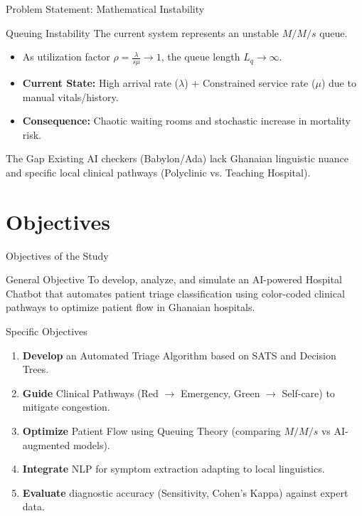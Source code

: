 \documentclass[aspectratio=169,12pt]{beamer}
\begin{document}
	\begin{frame}{Problem Statement: Mathematical Instability}
		\begin{alertblock}{Queuing Instability}
			The current system represents an unstable $M/M/s$ queue.
		\end{alertblock}
		
		\begin{itemize}
			\item As utilization factor $\rho = \frac{\lambda}{s\mu} \to 1$, the queue length $L_q \to \infty$.
			\item \textbf{Current State:} High arrival rate ($\lambda$) + Constrained service rate ($\mu$) due to manual vitals/history.
			\item \textbf{Consequence:} Chaotic waiting rooms and stochastic increase in mortality risk.
		\end{itemize}
		
		\begin{exampleblock}{The Gap}
			Existing AI checkers (Babylon/Ada) lack Ghanaian linguistic nuance and specific local clinical pathways (Polyclinic vs. Teaching Hospital).
		\end{exampleblock}
	\end{frame}
	
	\section{Objectives }
	
	\begin{frame}{Objectives of the Study}
		\begin{block}{General Objective}
			To develop, analyze, and simulate an AI-powered Hospital Chatbot that automates patient triage classification using color-coded clinical pathways to optimize patient flow in Ghanaian hospitals.
		\end{block}
		
		\begin{block}{Specific Objectives}
			\begin{enumerate}
				\item \textbf{Develop} an Automated Triage Algorithm based on SATS and Decision Trees.
				\item \textbf{Guide} Clinical Pathways (Red $\to$ Emergency, Green $\to$ Self-care) to mitigate congestion.
				\item \textbf{Optimize} Patient Flow using Queuing Theory (comparing $M/M/s$ vs AI-augmented models).
				\item \textbf{Integrate} NLP for symptom extraction adapting to local linguistics.
				\item \textbf{Evaluate} diagnostic accuracy (Sensitivity, Cohen's Kappa) against expert data.
			\end{enumerate}
		\end{block}
	\end{frame}
	
\end{document}
